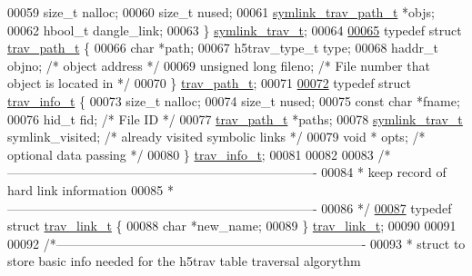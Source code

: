 \begin{DoxyCode}
00059     \textcolor{keywordtype}{size\_t}      nalloc;
00060     \textcolor{keywordtype}{size\_t}      nused;
00061     \hyperlink{structsymlink__trav__path__t}{symlink\_trav\_path\_t} *objs;
00062     hbool\_t dangle\_link;
00063 \} \hyperlink{structsymlink__trav__t}{symlink\_trav\_t};
00064 
\hyperlink{structtrav__path__t}{00065} \textcolor{keyword}{typedef} \textcolor{keyword}{struct }\hyperlink{structtrav__path__t}{trav\_path\_t} \{
00066     \textcolor{keywordtype}{char}      *path;
00067     h5trav\_type\_t type;
00068     haddr\_t     objno;     \textcolor{comment}{/* object address */}
00069     \textcolor{keywordtype}{unsigned} \textcolor{keywordtype}{long}   fileno; \textcolor{comment}{/* File number that object is located in */}
00070 \} \hyperlink{structtrav__path__t}{trav\_path\_t};
00071 
\hyperlink{structtrav__info__t}{00072} \textcolor{keyword}{typedef} \textcolor{keyword}{struct }\hyperlink{structtrav__info__t}{trav\_info\_t} \{
00073     \textcolor{keywordtype}{size\_t}      nalloc;
00074     \textcolor{keywordtype}{size\_t}      nused;
00075     \textcolor{keyword}{const} \textcolor{keywordtype}{char} *fname;
00076     hid\_t fid;                          \textcolor{comment}{/* File ID */}
00077     \hyperlink{structtrav__path__t}{trav\_path\_t} *paths;
00078     \hyperlink{structsymlink__trav__t}{symlink\_trav\_t} symlink\_visited;     \textcolor{comment}{/* already visited symbolic links */}
00079     \textcolor{keywordtype}{void} * opts;                        \textcolor{comment}{/* optional data passing */}
00080 \} \hyperlink{structtrav__info__t}{trav\_info\_t};
00081 
00082 
00083 \textcolor{comment}{/*-------------------------------------------------------------------------}
00084 \textcolor{comment}{ * keep record of hard link information}
00085 \textcolor{comment}{ *-------------------------------------------------------------------------}
00086 \textcolor{comment}{ */}
\hyperlink{structtrav__link__t}{00087} \textcolor{keyword}{typedef} \textcolor{keyword}{struct }\hyperlink{structtrav__link__t}{trav\_link\_t} \{
00088     \textcolor{keywordtype}{char}      *new\_name;
00089 \} \hyperlink{structtrav__link__t}{trav\_link\_t};
00090 
00091 
00092 \textcolor{comment}{/*-------------------------------------------------------------------------}
00093 \textcolor{comment}{ * struct to store basic info needed for the h5trav table traversal algorythm}

\end{DoxyCode}
